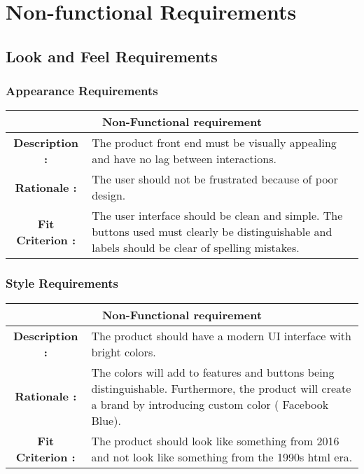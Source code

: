 \documentclass[12pt, titlepage]{article}
\begin{document}
\section{Non-functional Requirements}

\subsection{Look and Feel Requirements}

\subsubsection{Appearance Requirements}

\begin{center}
\begin{table}[H]
\begin{tabularx}{\textwidth}{| c X |}
\hline
\multicolumn{2}{|c|}{\textbf{Non-Functional requirement}}\\
\hline
\textbf{Description : } & The product front end must be visually appealing and have no lag between interactions. \\
\hline
\textbf{Rationale : } & The user should not be frustrated because of poor design.\\
\hline
\textbf{Fit Criterion : } &  The user interface should be clean and simple. The buttons used must clearly be distinguishable and labels should be clear of spelling mistakes.\\
\hline
\end{tabularx}
\end{table}
\end{center}

\subsubsection{Style Requirements}

\begin{center}
\begin{table}[H]
\begin{tabularx}{\textwidth}{| c X |}
\hline
\multicolumn{2}{|c|}{\textbf{Non-Functional requirement}}\\
\hline
\textbf{Description : } & The product should have a modern UI interface with bright colors. \\
\hline
\textbf{Rationale : } & The colors will add to features and buttons being distinguishable. Furthermore, the product will create a brand by introducing custom color ( Facebook Blue).\\
\hline
\textbf{Fit Criterion : } &  The product should look like something from 2016 and not look like something from the 1990s html era.\\
\hline
\end{tabularx}
\end{table}
\end{center}
\end{document}
